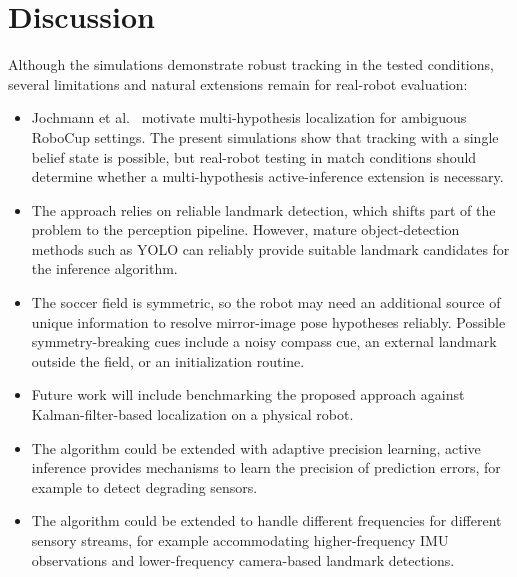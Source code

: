\section{Discussion}
\label{sec:discussion}
Although the simulations demonstrate robust tracking in the tested conditions, several limitations and natural extensions remain for real-robot evaluation:
\begin{itemize}
    \item Jochmann et al.~\cite{jochmann_efficient_2012} motivate multi-hypothesis localization for ambiguous RoboCup settings. The present simulations show that tracking with a single belief state is possible, but real-robot testing in match conditions should determine whether a multi-hypothesis active-inference extension is necessary.
    \item The approach relies on reliable landmark detection, which shifts part of the problem to the perception pipeline. However, mature object-detection methods such as YOLO can reliably provide suitable landmark candidates for the inference algorithm.
    \item The soccer field is symmetric, so the robot may need an additional source of unique information to resolve mirror-image pose hypotheses reliably. Possible symmetry-breaking cues include a noisy compass cue, an external landmark outside the field, or an initialization routine.
    \item Future work will include benchmarking the proposed approach against Kalman-filter-based localization on a physical robot.
    \item The algorithm could be extended with adaptive precision learning, active inference provides mechanisms to learn the precision of prediction errors, for example to detect degrading sensors.
    \item The algorithm could be extended to handle different frequencies for different sensory streams, for example accommodating higher-frequency IMU observations and lower-frequency camera-based landmark detections.
\end{itemize}
